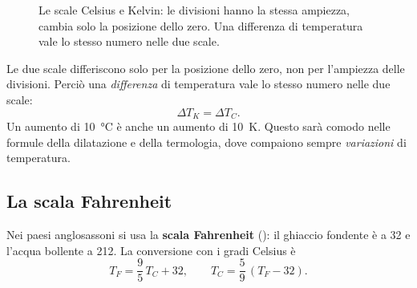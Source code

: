 \begin{figure}[!htbp]
    \centering
    \caption{Le scale Celsius e Kelvin: le divisioni hanno la stessa ampiezza, cambia solo la posizione dello zero. Una differenza di temperatura vale lo stesso numero nelle due scale.}
    \label{fig:scale-termometriche}
\end{figure}

\begin{remark}
Le due scale differiscono solo per la posizione dello zero, non per l'ampiezza delle divisioni. Perciò una \emph{differenza} di temperatura vale lo stesso numero nelle due scale:
\[ \Delta T_K = \Delta T_C. \]
Un aumento di \SI{10}{\celsius} è anche un aumento di \SI{10}{\kelvin}. Questo sarà comodo nelle formule della dilatazione e della termologia, dove compaiono sempre \emph{variazioni} di temperatura.
\end{remark}

\subsection{La scala Fahrenheit}
Nei paesi anglosassoni si usa la \textbf{scala Fahrenheit} (\si{\fahrenheit}): il ghiaccio fondente è a \SI{32}{\fahrenheit} e l'acqua bollente a \SI{212}{\fahrenheit}. La conversione con i gradi Celsius è
\[ T_F = \frac{9}{5}\,T_C + 32, \qquad T_C = \frac{5}{9}\,(T_F - 32). \]

